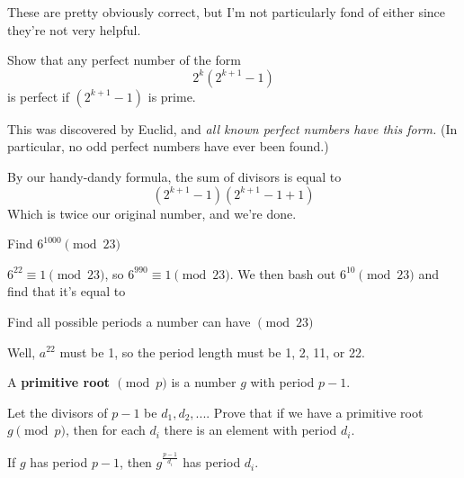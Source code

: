 \documentclass{scrartcl}
\begin{document}
\begin{exercise}
	These are pretty obviously correct, but I'm not particularly fond of either since they're not very helpful.
\end{exercise}

\setcounter{exercise}{14}

\begin{exercise}
	Show that any perfect number of the form
	\[2^k\left(2^{k+1}-1\right)\]
	is perfect if $(2^{k+1} - 1)$ is prime.

	This was discovered by Euclid, and \emph{all known perfect numbers have this form.} (In particular, no odd perfect numbers have ever been found.)
	\begin{soln}
		By our handy-dandy formula,
		the sum of divisors is equal to
		\[(2^{k+1} - 1)(2^{k+1} - 1 + 1)\]
		Which is twice our original number, and we're done.
	\end{soln}
\end{exercise}

\setcounter{exercise}{18}

\begin{exercise}
	Find $6^{1000} \pmod{23}$
	\begin{soln}
		$6^{22} \equiv 1 \pmod{23}$, so $6^{990} \equiv 1 \pmod{23}$. 
		We then bash out $6^{10} \pmod{23}$ and find that it's equal to 
	\end{soln}
\end{exercise}

\begin{exercise}
	Find all possible periods a number can have $\pmod{23}$
	\begin{soln}
		Well, $a^22$ must be 1, so the period length must be 1, 2, 11, or 22.
	\end{soln}
\end{exercise}
\begin{definition*}
	A \textbf{primitive root $\pmod{p}$} is a number $g$ with period $p-1$.
\end{definition*}
\begin{exercise}
	Let the divisors of $p-1$ be $d_1, d_2, ....$ Prove that if we have a primitive root $g \pmod{p}$, then for each $d_i$ there is an element with period $d_i$.
	\begin{soln}
		If $g$ has period $p-1$, then $g^{\frac{p-1}{d_i}}$ has period $d_i$.
	\end{soln}
\end{exercise}

\setcounter{exercise}{23}
\end{document}
